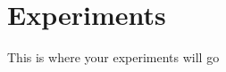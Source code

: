 \documentclass[./dissertation.tex]{subfiles}
\begin{document}
    \section{Experiments}
    This is where your experiments will go
\end{document}
